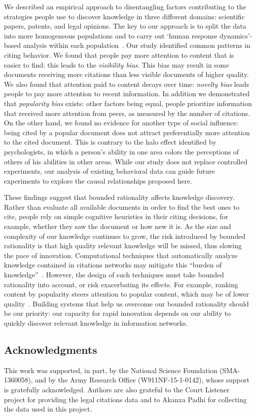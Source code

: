 \documentclass[10pt]{bmc_article}
\newenvironment{bmcformat}{\baselineskip20pt\sloppy\setboolean{publ}{false}}{\baselineskip20pt\sloppy}
\begin{document}
\begin{bmcformat}
We described an empirical approach to disentangling factors contributing to the strategies people use to discover knowledge in three different domains: scientific papers, patents, and legal opinions. The key to our approach is to split the data into more homogeneous populations and to carry out `human response dynamics'-based analysis within each population~\cite{Hodas12socialcom}.
Our study identified common patterns in citing behavior. We found that people pay more attention to content that is easier to find: this leads to the \emph{visibility bias}. This bias may result in some documents receiving more citations than less visible documents of higher quality. We also found that attention paid to content decays over time: \emph{novelty bias} leads people to pay more attention to recent information. In addition we demonstrated that \emph{popularity bias} exists: other factors being equal, people prioritize information that received more attention from peers, as measured by the number of citations.
On the other hand, we  found no evidence for another type of social influence: being cited by a popular document does not attract preferentially more attention to the cited document. This is contrary to the halo effect identified by psychologists, in which a person's ability in one area colors the perceptions of others of his abilities in other areas.  While our study does not replace controlled experiments, our analysis of existing behavioral data can guide future experiments to explore the causal relationships proposed here.

These findings suggest that bounded rationality affects knowledge discovery. Rather than evaluate all available documents in order to find the best ones to cite, people rely on simple cognitive heuristics in their citing decisions, for example, whether they saw the document or how new it is.
As the size and complexity of our knowledge continues to grow, the risk introduced by bounded rationality is that high quality relevant knowledge will be missed, thus slowing the pace of innovation. Computational techniques that automatically analyze knowledge contained in citations networks may mitigate this ``burden of knowledge''~\cite{Jones09}. However, the design of such techniques must take bounded rationality into account, or risk exacerbating its effects. For example, ranking content by popularity steers attention to popular content, which may be of lower quality~\cite{Lerman14plosone}. Building systems that help us overcome our bounded rationality should be our priority: our capacity for rapid innovation depends on our ability to quickly discover relevant knowledge in information networks.

\subsection*{Acknowledgments}
This work was supported, in part, by the National Science Foundation (SMA-1360058), and by the Army Research Office (W911NF-15-1-0142), whose support is gratefully acknowledged. Authors are also grateful to the Court Listener project for providing the legal citations data and to Akanxa Padhi for collecting the data used in this project.

\end{bmcformat}
\end{document}
